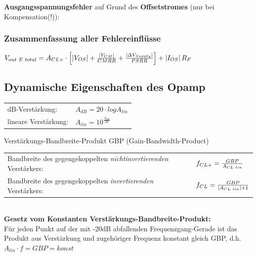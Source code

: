 			\begin{minipage}{18cm}
            	\vspace{3mm}
				\textbf{Ausgangsspannungsfehler} auf Grund des \textbf{Offsetstromes} (nur bei
				Kompensation(!)):
				\\
			\end{minipage}

		\subsubsection{Zusammenfassung aller Fehlereinflüsse}
      $V_{out\hspace{1mm}E\hspace{1mm}total}=A_{CL+}\cdot\left[\left|V_{OS}\right|+\frac{\left|V_{CM}\right|}{CMRR}
            	+\frac{\left|\Delta V_{Supply}\right|}{PSRR}\right]+\left|I_{OS}\right|R_F$\\

	\subsection{Dynamische Eigenschaften des Opamp}
		\begin{tabular}{ll}
			dB-Verstärkung:&
			$A_{dB}=20 \cdot log A_{lin}$\\
			lineare Verstärkung:&
			$A_{lin}=10^{\frac{A_{dB}}{20}}$\\
		\end{tabular}
		Verstärkungs-Bandbreite-Produkt GBP (Gain-Bandwidth-Product)\\
		\begin{tabular}{ll}
			Bandbreite des gegengekoppelten {\it nichtinvertierenden} Verstärkers:&
			$f_{CL+}=\frac{GBP}{A_{CL \hspace{1mm}lin}}$\\
			Bandbreite des gegengekoppelten {\it invertierenden} Verstärkers: &
			$f_{CL}=\frac{GBP}{\left| A_{CL \hspace{1mm}lin}\right|+1}$\\
		\end{tabular}\\
		{\bf Gesetz vom Konstanten Verstärkungs-Bandbreite-Produkt:} \\
		Für jeden Punkt auf der mit -20dB abfallenden Frequenzgang-Gerade ist das
		Produkt aus Verstärkung und zugehöriger Frequenz konstant gleich GBP, d.h. $A_{lin}\cdot f=GBP=konst$\\
